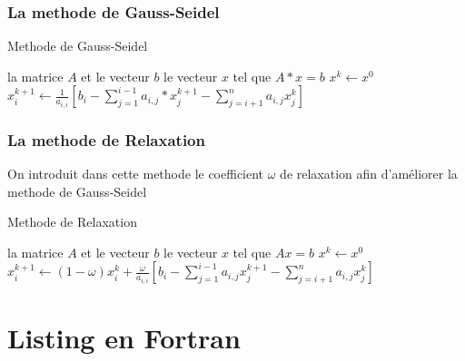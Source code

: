 \documentclass{report}
\begin{document}
\newpage
\subsubsection{La methode de Gauss-Seidel}
\begin{algorithm}
\caption{Methode de Gauss-Seidel}
\begin{algorithmic} 
\REQUIRE la matrice $A$ et le vecteur $b$
\ENSURE le vecteur $x$ tel que $A*x = b$
\STATE $x^k \leftarrow x^0$
\STATE $x^{k+1}_{i} \leftarrow \frac{1}{a_{i,i}} [b_i - \displaystyle\sum^{i-1}_{j=1}{a_{i,j}*x^{k+1}_{j}} - \displaystyle\sum^{n}_{j=i+1}{a_{i,j}x^{k}_{j}}]$
\ENDFOR
\ENDWHILE
\end{algorithmic}
\end{algorithm}

\subsubsection{La methode de Relaxation}
On introduit dans cette methode le coefficient $\omega$ de relaxation afin \og d'améliorer \fg la methode de Gauss-Seidel
\begin{algorithm}
\caption{Methode de Relaxation}
\begin{algorithmic} 
\REQUIRE la matrice $A$ et le vecteur $b$
\ENSURE le vecteur $x$ tel que $Ax = b$
\STATE $x^k \leftarrow x^0$
\STATE $x^{k+1}_{i} \leftarrow (1 - \omega)x^{k}_{i} + \frac{\omega}{a_{i,i}} [b_i - \displaystyle\sum^{i-1}_{j=1}{a_{i,j}x^{k+1}_{j}} - \displaystyle\sum^{n}_{j=i+1}{a_{i,j}x^{k}_{j}}]$
\ENDFOR
\ENDWHILE
\end{algorithmic}
\end{algorithm}


\newpage
\section{Listing en Fortran}
\end{document}

